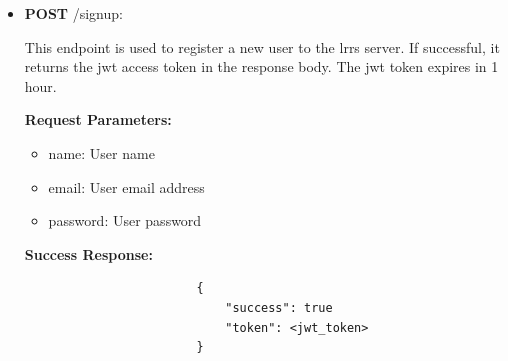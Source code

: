 \documentclass[12pt]{article}
\begin{document}
        \begin{itemize}
            \item \textbf{POST} /signup:
                \begin{addmargin}[1em]{2em}%
                    This endpoint is used to register a new user to the \acrshort{lrrs} server. If successful, it returns the jwt access token in the response body. The jwt token expires in 1 hour.
                    \par\textbf{Request Parameters:}
                    \begin{itemize}
                        \item name: User name
                        \item email: User email address
                        \item password: User password
                    \end{itemize}
                    \par\textbf{Success Response:}
                    \begin{listing}[H]
                    \begin{verbatim}
                        {     
                            "success": true
                            "token": <jwt_token>
                        }
                    \end{verbatim}
                    \end{listing}
                \end{addmargin}
                

\end{itemize}
\end{document}
